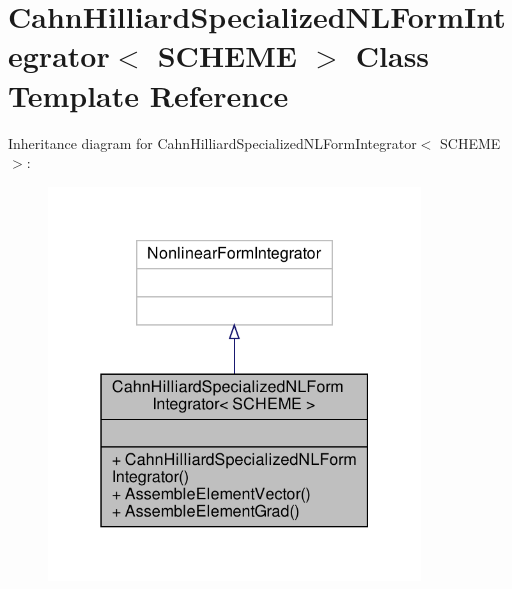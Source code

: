 \hypertarget{classCahnHilliardSpecializedNLFormIntegrator}{}\section{Cahn\+Hilliard\+Specialized\+N\+L\+Form\+Integrator$<$ S\+C\+H\+E\+ME $>$ Class Template Reference}
\label{classCahnHilliardSpecializedNLFormIntegrator}


Inheritance diagram for Cahn\+Hilliard\+Specialized\+N\+L\+Form\+Integrator$<$ S\+C\+H\+E\+ME $>$\+:\nopagebreak
\begin{figure}[H]
\begin{center}
\leavevmode
\includegraphics[width=280pt]{classCahnHilliardSpecializedNLFormIntegrator__inherit__graph}
\end{center}
\end{figure}


